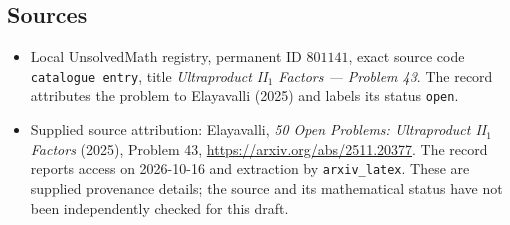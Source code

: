 \documentclass[11pt]{article}
\begin{document}
\subsection{Sources}
\begin{itemize}
\item Local UnsolvedMath registry, permanent ID \(801141\), exact source code \texttt{catalogue entry}, title \emph{Ultraproduct II\(_1\) Factors --- Problem 43}. The record attributes the problem to Elayavalli (2025) and labels its status \texttt{open}.
\item Supplied source attribution: Elayavalli, \emph{50 Open Problems: Ultraproduct II\(_1\) Factors} (2025), Problem 43, \url{https://arxiv.org/abs/2511.20377}. The record reports access on 2026-10-16 and extraction by \texttt{arxiv\_latex}. These are supplied provenance details; the source and its mathematical status have not been independently checked for this draft.
\end{itemize}
\end{document}
